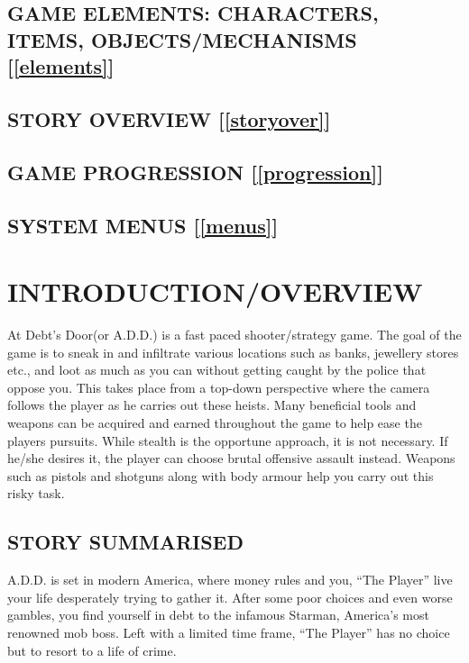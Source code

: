 \documentclass{article}
\begin{document}
\subsection{GAME ELEMENTS: CHARACTERS, ITEMS, OBJECTS/MECHANISMS [\ref{elements}]}

%

\subsection{STORY OVERVIEW [\ref{storyover}]}

%

\subsection{GAME PROGRESSION [\ref{progression}]}

%

\subsection{SYSTEM MENUS [\ref{menus}]}


\section{INTRODUCTION/OVERVIEW \label{intro}}
At Debt’s Door(or A.D.D.) is a fast paced shooter/strategy game. The goal of the game is to sneak in and infiltrate various locations such as banks, jewellery stores etc., and loot as much as you can without getting caught by the police that oppose you. This takes place from a top-down perspective where the camera follows the player as he carries out these heists. Many beneficial tools and weapons can be acquired and earned throughout the game to help ease the players pursuits.
\bigbreak
While stealth is the opportune approach, it is not necessary. If he/she desires it, the player can choose brutal offensive assault instead. Weapons such as pistols and shotguns along with body armour help you carry out this risky task.

\subsection{STORY SUMMARISED \label{storysumm}}
A.D.D. is set in modern America, where money rules and you, “The Player” live your life desperately trying to gather it. After some poor choices and even worse gambles, you find yourself in debt to the infamous Starman, America’s most renowned mob boss. Left with a limited time frame, “The Player” has no choice but to resort to a life of crime.
\end{document}
